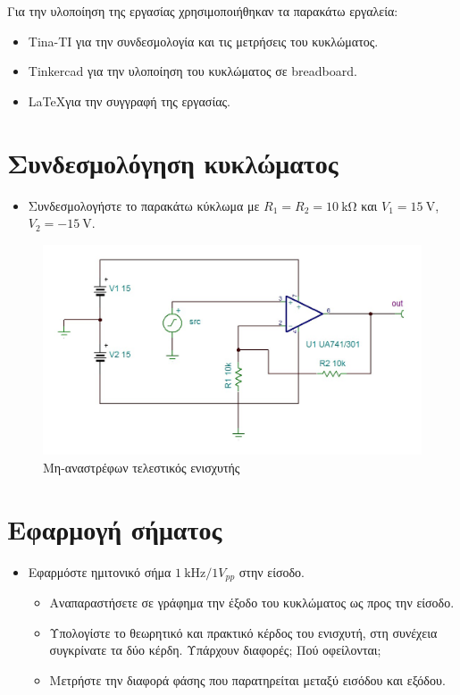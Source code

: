 \documentclass[12pt]{article}
\begin{document}
Για την υλοποίηση της εργασίας χρησιμοποιήθηκαν τα παρακάτω εργαλεία:
\begin{itemize}
	\item Tina-TI για την συνδεσμολογία και τις μετρήσεις του κυκλώματος.
	\item Tinkercad για την υλοποίηση του κυκλώματος σε breadboard.
	\item \LaTeX για την συγγραφή της εργασίας.
\end{itemize}

\section{Συνδεσμολόγηση κυκλώματος}

\begin{itemize}
	\item Συνδεσμολογήστε το παρακάτω κύκλωμα με
		$R_1 = R_2 = \SI{10}{\kilo\ohm}$ και
		$V_1 = \SI{15}{\volt}$,
		$V_2 = \SI{-15}{\volt}$.
\end{itemize}

\begin{figure}[H]
	\centering
	\includegraphics[width=\linewidth]{./res/schem.jpg}
	\caption{Μη-αναστρέφων τελεστικός ενισχυτής}
\end{figure}

\section{Εφαρμογή σήματος}

\begin{itemize}
	\item Εφαρμόστε ημιτονικό σήμα $\SI{1}{\kilo\hertz}/1V_{pp}$ στην είσοδο.
	\begin{itemize}
		\item Αναπαραστήσετε σε γράφημα την έξοδο του κυκλώματος ως
			προς την είσοδο.
		\item Υπολογίστε το θεωρητικό και πρακτικό κέρδος του ενισχυτή,
			στη συνέχεια συγκρίνατε τα δύο κέρδη. Υπάρχουν
			διαφορές; Πού οφείλονται;
		\item Μετρήστε την διαφορά φάσης που παρατηρείται μεταξύ
			εισόδου και εξόδου.
	\end{itemize}
\end{itemize}
\end{document}
